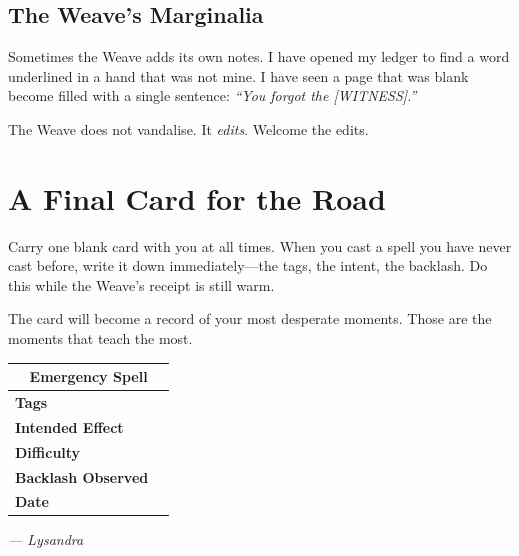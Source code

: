 \subsection{The Weave's Marginalia}

Sometimes the Weave adds its own notes. I have opened my ledger to find a word underlined in a hand that was not mine. I have seen a page that was blank become filled with a single sentence: \emph{``You forgot the [WITNESS].''}

The Weave does not vandalise. It \emph{edits}. Welcome the edits.

\section{A Final Card for the Road}

Carry one blank card with you at all times. When you cast a spell you have never cast before, write it down immediately---the tags, the intent, the backlash. Do this while the Weave's receipt is still warm.

The card will become a record of your most desperate moments. Those are the moments that teach the most.

\vspace{2em}

\noindent
\begin{tabular}{|p{}|p{}|}
\hline
\multicolumn{2}{|c|}{\textbf{Emergency Spell}}\\
\hline
\textbf{Tags} & \\
\hline
\textbf{Intended Effect} & \\
\hline
\textbf{Difficulty} & \\
\hline
\textbf{Backlash Observed} & \\
\hline
\textbf{Date} & \\
\hline
\end{tabular}

\vspace{1em}

\textit{--- Lysandra}
